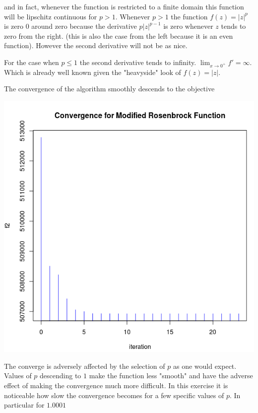 and in fact, whenever the function is restricted to a finite domain this function will be lipschitz continuous for $p > 1$. Whenever $p > 1$ the function $f(z) = |z|^p$ is zero $0$ around zero because the derivative $p |z| ^{p-1}$ is zero whenever $z$ tends to zero from the right. (this is also the case from the left because it is an even function). However the second derivative will not be as nice.

For the case when $p \leq 1$ the second derivative tends to infinity. $\displaystyle \lim_{x \to 0^+} {f' = \infty}$. Which is already well known given the "heavyside" look of $f(z) = |z|$.

The convergence of the algorithm smoothly descends to the objective 

\begin{center}
\includegraphics[scale=0.3]{Figures/convergence.png}
\end{center}

The converge is adversely affected by the selection of $p$ as one would expect. Values of $p$ descending to $1$ make the function less "smooth" and have the adverse effect of making the convergence much more difficult. In this exercise it is noticeable how slow the convergence becomes for a few specific values of $p$. In particular for $1.0001$

